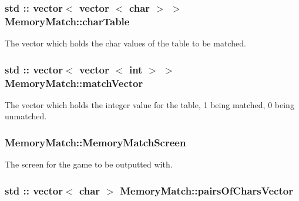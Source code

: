\hypertarget{classMemoryMatch_a06ea18368c12d6b067ff18b389ba86c4}{
\subsubsection[{char\-Table}]{\setlength{\rightskip}{0pt plus 5cm}std \-:: vector$<$ vector $<$ char $>$ $>$ Memory\-Match\-::char\-Table\hspace{0.3cm}{\ttfamily [private]}}}\label{classMemoryMatch_a06ea18368c12d6b067ff18b389ba86c4}


The vector which holds the char values of the table to be matched. 

\hypertarget{classMemoryMatch_a4e49279d32294d1f464751956868b7aa}{
\subsubsection[{match\-Vector}]{\setlength{\rightskip}{0pt plus 5cm}std \-:: vector$<$ vector $<$ int $>$ $>$ Memory\-Match\-::match\-Vector\hspace{0.3cm}{\ttfamily [private]}}}\label{classMemoryMatch_a4e49279d32294d1f464751956868b7aa}
The vector which holds the integer value for the table, 1 being matched, 0 being unmatched. \hypertarget{classMemoryMatch_a78399975fec5fea7b2102449a4536fcd}{
\subsubsection[{Memory\-Match\-Screen}]{ Memory\-Match\-::\-Memory\-Match\-Screen\hspace{0.3cm}{\ttfamily [private]}}}\label{classMemoryMatch_a78399975fec5fea7b2102449a4536fcd}


The screen for the game to be outputted with. 

\hypertarget{classMemoryMatch_a377424818fa6730a40795ced32e201de}{
\subsubsection[{pairs\-Of\-Chars\-Vector}]{\setlength{\rightskip}{0pt plus 5cm}std \-:: vector$<$ char $>$ Memory\-Match\-::pairs\-Of\-Chars\-Vector\hspace{0.3cm}{\ttfamily [private]}}}\label{classMemoryMatch_a377424818fa6730a40795ced32e201de}



